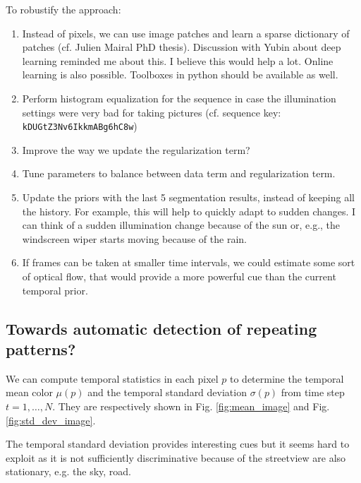 \documentclass[a4paper,twoside,10pt]{article}
\begin{document}
To robustify the approach:
\begin{enumerate}
\item Instead of pixels, we can use image patches and learn a sparse dictionary of patches (cf. Julien Mairal PhD thesis). Discussion with Yubin about deep learning reminded me about this. I believe this would help a lot. Online learning is also possible. Toolboxes in python should be available as well.
\item Perform histogram equalization for the sequence in case the illumination settings were very bad for taking pictures (cf. sequence key: \texttt{kDUGtZ3Nv6IkkmABg6hC8w})
\item Improve the way we update the regularization term?
\item Tune parameters to balance between data term and regularization term.
\item Update the priors with the last 5 segmentation results, instead of keeping all the history. For example, this will help to quickly adapt to sudden changes. I can think of a sudden illumination change because of the sun or, e.g., the windscreen wiper starts moving because of the rain.
\item If frames can be taken at smaller time intervals, we could estimate some sort of optical flow, that would provide a more powerful cue than the current temporal prior.
\end{enumerate}


\subsection{Towards automatic detection of repeating patterns?}

We can compute temporal statistics in each pixel $p$ to determine the temporal mean color $\mu(p)$ and the temporal standard deviation $\sigma(p)$ from time step $t=1,\dots,N$. They are respectively shown in Fig. \ref{fig:mean_image} and Fig. \ref{fig:std_dev_image}.

The temporal standard deviation provides interesting cues but it seems hard to exploit as it is not sufficiently discriminative because of the streetview are also stationary, e.g. the sky, road.
\end{document}
